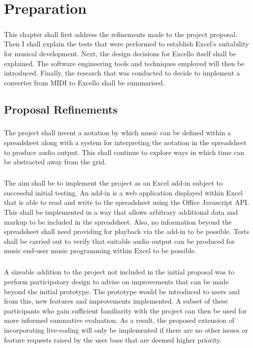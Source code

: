 
\chapter{Preparation}

\paragraph{} This chapter shall first address the refinements made to the project proposal. Then I shall explain the tests that were performed to establish Excel's suitability for musical development. Next, the design decisions for Excello itself shall be explained. The software engineering tools and techniques employed will then be introduced. Finally, the research that was conducted to decide to implement a converter from MIDI to Excello shall be summarised.

\section{Proposal Refinements}

\paragraph{} The project shall invent a notation by which music can be defined within a spreadsheet along with a system for interpreting the notation in the spreadsheet to produce audio output. This shall continue to explore ways in which time can be abstracted away from the grid.

\paragraph{} The aim shall be to implement the project as an Excel add-in subject to successful initial testing. An add-in is a web application displayed within Excel that is able to read and write to the spreadsheet using the Office Javascript API. This shall be implemented in a way that allows arbitrary additional data and markup to be included in the spreadsheet. Also, no information beyond the spreadsheet shall need providing for playback via the add-in to be possible. Tests shall be carried out to verify that suitable audio output can be produced for music end-user music programming within Excel to be possible.

\paragraph{} A sizeable addition to the project not included in the initial proposal was to perform participatory design \cite{muller:pd} to advise on improvements that can be made beyond the initial prototype. The prototype would be introduced to users and from this, new features and improvements implemented. A subset of these participants who gain sufficient familiarity with the project can then be used for more informed summative evaluation. As a result, the proposed extension of incorporating live-coding will only be implemented if there are no other issues or feature requests raised by the user base that are deemed higher priority.

